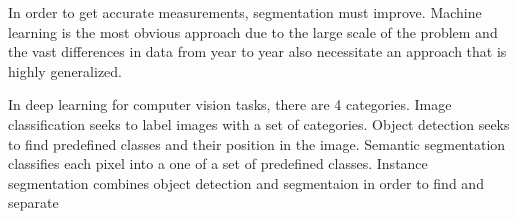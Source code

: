 In order to get accurate measurements, segmentation must improve. Machine learning is the most obvious approach due to the large scale of the problem and the vast differences in data from year to year also necessitate an approach that is highly generalized. 

In deep learning for computer vision tasks, there are 4 categories. Image classification seeks to label images with a set of categories. Object detection seeks to find predefined classes and their position in the image. Semantic segmentation classifies each pixel into a one of a set of predefined classes. Instance segmentation combines object detection and segmentaion in order to find and separate  



